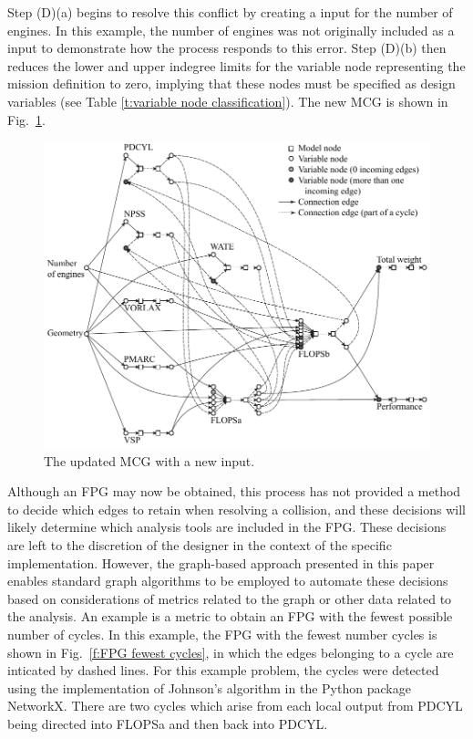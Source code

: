 Step (D)(a) begins to resolve this conflict by creating a input for the number of engines. In this example, the number of engines was not originally included as a input to demonstrate how the process responds to this error.
Step (D)(b) then reduces the lower and upper indegree limits for the variable node representing the mission definition to zero, implying that these nodes must be specified as design variables (see Table \ref{t:variable node classification}). The new MCG is shown in Fig.~\ref{f:MCG}.
	\begin{figure}[htb!]
	  \begin{center}
		\includegraphics[width=6in]{images/MCG_edit}
	  \end{center}
	  \caption{The updated MCG with a new input.}
	\label{f:MCG}
	\end{figure}

	Although an FPG may now be obtained, this process has not provided a method to decide which edges to retain when resolving a collision, and these decisions will likely determine which analysis tools are included in the FPG. These decisions are left to the discretion of the designer in the context of the specific implementation. 
	However, the graph-based approach presented in this paper enables standard graph algorithms to be employed to automate these decisions based on considerations of metrics related to the graph or other data related to the analysis. 
	An example is a metric to obtain an FPG with the fewest possible number of cycles. 
In this example, the FPG with the fewest number cycles is shown in Fig.~\ref{f:FPG fewest cycles}, in which the edges belonging to a cycle are inticated by dashed lines. 
For this example problem, the cycles were detected using the implementation of Johnson's algorithm \cite{Johnson1975} in the Python package NetworkX. 
There are two cycles which arise from each local output from PDCYL being directed into FLOPSa and then back into PDCYL. 

